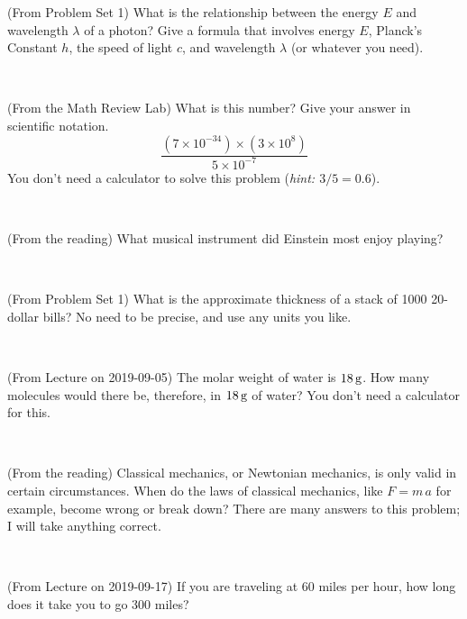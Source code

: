 \documentclass[12pt, letterpaper]{article}
\begin{document}
\begin{problem} (From Problem Set 1)
What is the relationship between the energy $E$ and wavelength
$\lambda$ of a photon? Give a formula that involves energy $E$,
Planck's Constant $h$, the speed of light $c$, and wavelength
$\lambda$ (or whatever you need).
\end{problem}

\vfill ~

\begin{problem} (From the Math Review Lab)
What is this number? Give your answer in scientific notation.
$$
\frac{(7\times10^{-34})\times(3\times10^8)}{5\times10^{-7}}
$$
You don't need a calculator to solve this problem (\textit{hint: $3/5=0.6$}).
\end{problem}


\vfill ~

\begin{problem} (From the reading)
What musical instrument did Einstein most enjoy playing?
\end{problem}


\vfill ~

\begin{problem} (From Problem Set 1)
What is the approximate thickness of a stack of 1000 20-dollar bills?
No need to be precise, and use any units you like.
\end{problem}


\vfill ~


\clearpage


\begin{problem} (From Lecture on 2019-09-05)
The molar weight of water is $18\,\mathrm{g}$. How many molecules would there
be, therefore, in $18\,\mathrm{g}$ of water? You don't need a calculator for
this.
\end{problem}


\vfill ~

\begin{problem} (From the reading)
Classical mechanics, or Newtonian mechanics, is only valid in certain
circumstances. When do the laws of classical mechanics, like $F =
m\,a$ for example, become wrong or break down? There are many answers
to this problem; I will take anything correct.
\end{problem}


\vfill ~

\begin{problem} (From Lecture on 2019-09-17)
If you are traveling at 60 miles per hour, how long does
it take you to go 300 miles?
\end{problem}
\end{document}
